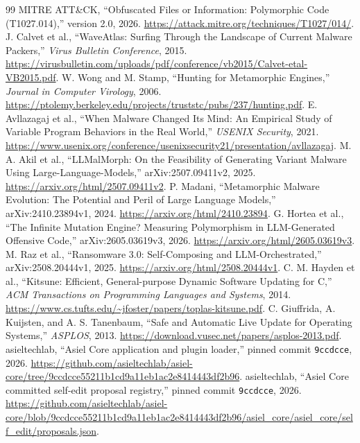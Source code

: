 \documentclass[11pt,letterpaper]{article}
\begin{document}
\begingroup\fontsize{9.2}{10.7}\selectfont\raggedright
\begin{thebibliography}{99}
\setlength{\itemsep}{0pt}
\setlength{\parsep}{0pt}
 MITRE ATT\&CK, ``Obfuscated Files or Information: Polymorphic Code (T1027.014),'' version 2.0, 2026. \url{https://attack.mitre.org/techniques/T1027/014/}.
 J. Calvet et al., ``WaveAtlas: Surfing Through the Landscape of Current Malware Packers,'' \emph{Virus Bulletin Conference}, 2015. \url{https://virusbulletin.com/uploads/pdf/conference/vb2015/Calvet-etal-VB2015.pdf}.
 W. Wong and M. Stamp, ``Hunting for Metamorphic Engines,'' \emph{Journal in Computer Virology}, 2006. \url{https://ptolemy.berkeley.edu/projects/truststc/pubs/237/hunting.pdf}.
 E. Avllazagaj et al., ``When Malware Changed Its Mind: An Empirical Study of Variable Program Behaviors in the Real World,'' \emph{USENIX Security}, 2021. \url{https://www.usenix.org/conference/usenixsecurity21/presentation/avllazagaj}.
 M. A. Akil et al., ``LLMalMorph: On the Feasibility of Generating Variant Malware Using Large-Language-Models,'' arXiv:2507.09411v2, 2025. \url{https://arxiv.org/html/2507.09411v2}.
 P. Madani, ``Metamorphic Malware Evolution: The Potential and Peril of Large Language Models,'' arXiv:2410.23894v1, 2024. \url{https://arxiv.org/html/2410.23894}.
 G. Hortea et al., ``The Infinite Mutation Engine? Measuring Polymorphism in LLM-Generated Offensive Code,'' arXiv:2605.03619v3, 2026. \url{https://arxiv.org/html/2605.03619v3}.
 M. Raz et al., ``Ransomware 3.0: Self-Composing and LLM-Orchestrated,'' arXiv:2508.20444v1, 2025. \url{https://arxiv.org/html/2508.20444v1}.
 C. M. Hayden et al., ``Kitsune: Efficient, General-purpose Dynamic Software Updating for C,'' \emph{ACM Transactions on Programming Languages and Systems}, 2014. \url{https://www.cs.tufts.edu/~jfoster/papers/toplas-kitsune.pdf}.
 C. Giuffrida, A. Kuijsten, and A. S. Tanenbaum, ``Safe and Automatic Live Update for Operating Systems,'' \emph{ASPLOS}, 2013. \url{https://download.vusec.net/papers/asplos-2013.pdf}.
 asieltechlab, ``Asiel Core application and plugin loader,'' pinned commit \texttt{9ccdcce}, 2026. \url{https://github.com/asieltechlab/asiel-core/tree/9ccdcce55211b1cd9a11eb1ac2e8414443df2b96}.
 asieltechlab, ``Asiel Core committed self-edit proposal registry,'' pinned commit \texttt{9ccdcce}, 2026. \url{https://github.com/asieltechlab/asiel-core/blob/9ccdcce55211b1cd9a11eb1ac2e8414443df2b96/asiel_core/asiel_core/self_edit/proposals.json}.

\end{thebibliography}
\end{document}
